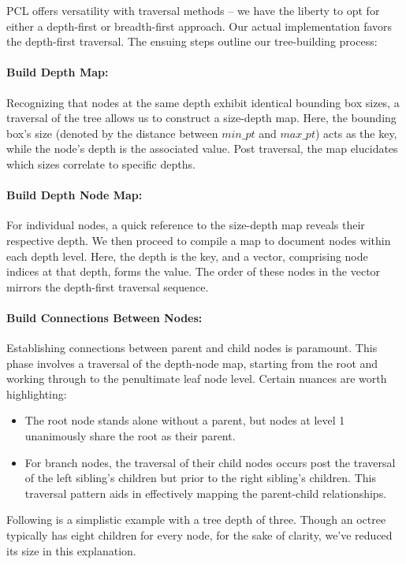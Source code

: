 \documentclass[11pt, a4paper,oneside,chapterprefix=false]{scrbook}
\begin{document}
PCL offers versatility with traversal methods – we have the liberty to opt for either a depth-first or breadth-first approach. Our actual implementation favors the depth-first traversal. The ensuing steps outline our tree-building process:

\paragraph{Build Depth Map:} Recognizing that nodes at the same depth exhibit identical bounding box sizes, a traversal of the tree allows us to construct a size-depth map. Here, the bounding box's size (denoted by the distance between \( min\_pt \) and \( max\_pt \)) acts as the key, while the node's depth is the associated value. Post traversal, the map elucidates which sizes correlate to specific depths.

\paragraph{Build Depth Node Map:} For individual nodes, a quick reference to the size-depth map reveals their respective depth. We then proceed to compile a map to document nodes within each depth level. Here, the depth is the key, and a vector, comprising node indices at that depth, forms the value. The order of these nodes in the vector mirrors the depth-first traversal sequence.

\paragraph{Build Connections Between Nodes:} Establishing connections between parent and child nodes is paramount. This phase involves a traversal of the depth-node map, starting from the root and working through to the penultimate leaf node level. Certain nuances are worth highlighting:

\begin{itemize}
	\item The root node stands alone without a parent, but nodes at level 1 unanimously share the root as their parent.
	\item For branch nodes, the traversal of their child nodes occurs post the traversal of the left sibling's children but prior to the right sibling's children. This traversal pattern aids in effectively mapping the parent-child relationships.
\end{itemize}

Following is a simplistic example with a tree depth of three. Though an octree typically has eight children for every node, for the sake of clarity, we've reduced its size in this explanation. 
\end{document}
